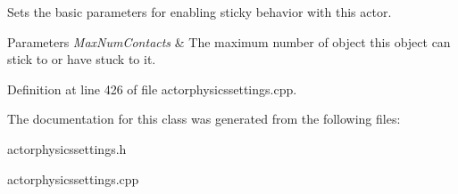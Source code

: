 Sets the basic parameters for enabling sticky behavior with this actor. 


\begin{DoxyParams}{Parameters}
{\em MaxNumContacts} & The maximum number of object this object can stick to or have stuck to it. \\
\hline
\end{DoxyParams}


Definition at line 426 of file actorphysicssettings.cpp.



The documentation for this class was generated from the following files:\begin{DoxyCompactItemize}
\item 
actorphysicssettings.h\item 
actorphysicssettings.cpp\end{DoxyCompactItemize}
